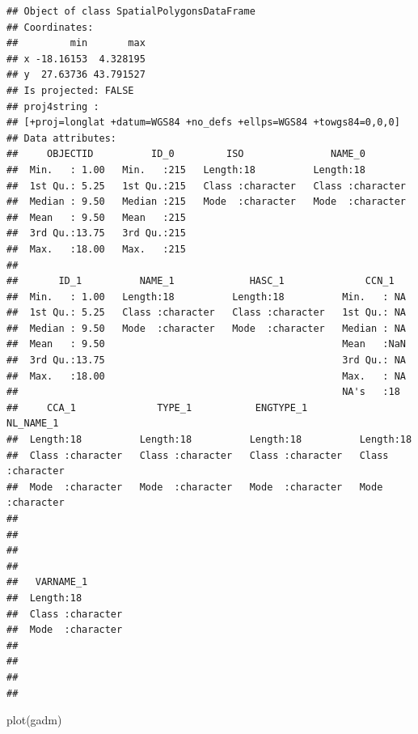 \documentclass[
  spanish,
]{book}
\newenvironment{Shaded}{\begin{snugshade}}{\end{snugshade}}
\newcommand{\FunctionTok}[1]{\textcolor[rgb]{0.00,0.00,0.00}{#1}}
\newcommand{\NormalTok}[1]{#1}
\theoremstyle{break}
\theoremstyle{definition}
\theoremstyle{definition}
\theoremstyle{definition}
\theoremstyle{definition}
\theoremstyle{remark}
\begin{document}
\begin{verbatim}
## Object of class SpatialPolygonsDataFrame
## Coordinates:
##         min       max
## x -18.16153  4.328195
## y  27.63736 43.791527
## Is projected: FALSE 
## proj4string :
## [+proj=longlat +datum=WGS84 +no_defs +ellps=WGS84 +towgs84=0,0,0]
## Data attributes:
##     OBJECTID          ID_0         ISO               NAME_0         
##  Min.   : 1.00   Min.   :215   Length:18          Length:18         
##  1st Qu.: 5.25   1st Qu.:215   Class :character   Class :character  
##  Median : 9.50   Median :215   Mode  :character   Mode  :character  
##  Mean   : 9.50   Mean   :215                                        
##  3rd Qu.:13.75   3rd Qu.:215                                        
##  Max.   :18.00   Max.   :215                                        
##                                                                     
##       ID_1          NAME_1             HASC_1              CCN_1    
##  Min.   : 1.00   Length:18          Length:18          Min.   : NA  
##  1st Qu.: 5.25   Class :character   Class :character   1st Qu.: NA  
##  Median : 9.50   Mode  :character   Mode  :character   Median : NA  
##  Mean   : 9.50                                         Mean   :NaN  
##  3rd Qu.:13.75                                         3rd Qu.: NA  
##  Max.   :18.00                                         Max.   : NA  
##                                                        NA's   :18   
##     CCA_1              TYPE_1           ENGTYPE_1          NL_NAME_1        
##  Length:18          Length:18          Length:18          Length:18         
##  Class :character   Class :character   Class :character   Class :character  
##  Mode  :character   Mode  :character   Mode  :character   Mode  :character  
##                                                                             
##                                                                             
##                                                                             
##                                                                             
##   VARNAME_1        
##  Length:18         
##  Class :character  
##  Mode  :character  
##                    
##                    
##                    
## 
\end{verbatim}

\begin{Shaded}
\begin{Highlighting}[]
\FunctionTok{plot}\NormalTok{(gadm)}
\end{Highlighting}
\end{Shaded}
\end{document}
